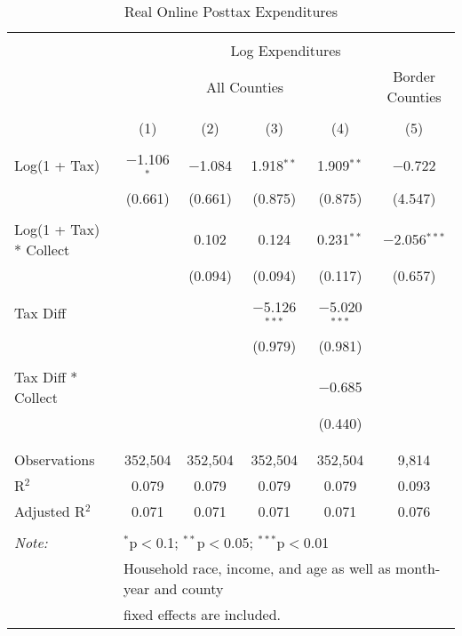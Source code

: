 
\begin{table}[!htbp] \centering 
  \caption{Real Online Posttax Expenditures} 
  \label{} 
\begin{tabular}{@{\extracolsep{5pt}}lccccc} 
\\[-1.8ex]\hline 
\hline \\[-1.8ex] 
 & \multicolumn{5}{c}{Log Expenditures} \\ 
\cline{2-6} 
 & \multicolumn{4}{c}{All Counties} & Border Counties \\ 
\\[-1.8ex] & (1) & (2) & (3) & (4) & (5)\\ 
\hline \\[-1.8ex] 
 Log(1 + Tax) & $-$1.106$^{*}$ & $-$1.084 & 1.918$^{**}$ & 1.909$^{**}$ & $-$0.722 \\ 
  & (0.661) & (0.661) & (0.875) & (0.875) & (4.547) \\ 
  & & & & & \\ 
 Log(1 + Tax) * Collect &  & 0.102 & 0.124 & 0.231$^{**}$ & $-$2.056$^{***}$ \\ 
  &  & (0.094) & (0.094) & (0.117) & (0.657) \\ 
  & & & & & \\ 
 Tax Diff &  &  & $-$5.126$^{***}$ & $-$5.020$^{***}$ &  \\ 
  &  &  & (0.979) & (0.981) &  \\ 
  & & & & & \\ 
 Tax Diff * Collect &  &  &  & $-$0.685 &  \\ 
  &  &  &  & (0.440) &  \\ 
  & & & & & \\ 
\hline \\[-1.8ex] 
Observations & 352,504 & 352,504 & 352,504 & 352,504 & 9,814 \\ 
R$^{2}$ & 0.079 & 0.079 & 0.079 & 0.079 & 0.093 \\ 
Adjusted R$^{2}$ & 0.071 & 0.071 & 0.071 & 0.071 & 0.076 \\ 
\hline 
\hline \\[-1.8ex] 
\textit{Note:}  & \multicolumn{5}{l}{$^{*}$p$<$0.1; $^{**}$p$<$0.05; $^{***}$p$<$0.01} \\ 
 & \multicolumn{5}{l}{Household race, income, and age as well as month-year and county} \\ 
 & \multicolumn{5}{l}{fixed effects are included.} \\ 
\end{tabular} 
\end{table} 
